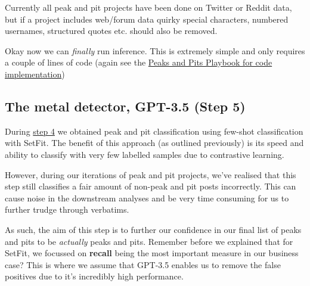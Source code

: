 \documentclass[
  letterpaper,
  DIV=11,
  numbers=noendperiod]{scrreprt}
\begin{document}
\begin{tcolorbox}[enhanced jigsaw, colback=white, opacitybacktitle=0.6, coltitle=black, left=2mm, breakable, bottomtitle=1mm, toptitle=1mm, toprule=.15mm, colframe=quarto-callout-warning-color-frame, titlerule=0mm, title=\textcolor{quarto-callout-warning-color}{\faExclamationTriangle}\hspace{0.5em}{Note on social media sources}, colbacktitle=quarto-callout-warning-color!10!white, rightrule=.15mm, bottomrule=.15mm, arc=.35mm, opacityback=0, leftrule=.75mm]

Currently all peak and pit projects have been done on Twitter or Reddit
data, but if a project includes web/forum data quirky special
characters, numbered usernames, structured quotes etc. should also be
removed.

\end{tcolorbox}

Okay now we can \emph{finally} run inference. This is extremely simple
and only requires a couple of lines of code (again see the
\href{https://jamiehshare.github.io/peaks-pits-bookdown/step-five.html}{Peaks
and Pits Playbook for code implementation})

\subsection{The metal detector, GPT-3.5 (Step 5)}\label{step-five}

During \hyperref[step-four]{step 4} we obtained peak and pit
classification using few-shot classification with SetFit. The benefit of
this approach (as outlined previously) is its speed and ability to
classify with very few labelled samples due to contrastive learning.

However, during our iterations of peak and pit projects, we've realised
that this step still classifies a fair amount of non-peak and pit posts
incorrectly. This can cause noise in the downstream analyses and be very
time consuming for us to further trudge through verbatims.

As such, the aim of this step is to further our confidence in our final
list of peaks and pits to be \emph{actually} peaks and pits. Remember
before we explained that for SetFit, we focussed on \textbf{recall}
being the most important measure in our business case? This is where we
assume that GPT-3.5 enables us to remove the false positives due to it's
incredibly high performance.
\end{document}
